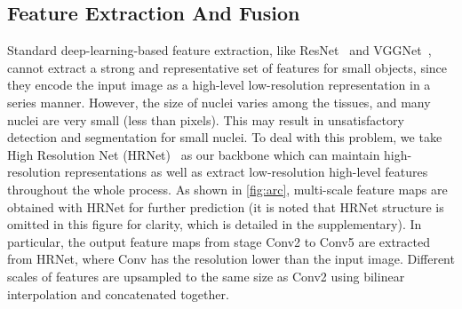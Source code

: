 \documentclass[lettersize,journal]{IEEEtran}
\begin{document}
\subsection{Feature Extraction And Fusion}
Standard deep-learning-based feature extraction, like ResNet~\cite{he2016identity} and VGGNet~\cite{simonyan2018very}, cannot extract a strong and representative set of features for small objects, since they encode the input image as a high-level low-resolution representation in a series manner. However, the size of nuclei varies among the tissues, and many nuclei are very small (less than  pixels). This may result in unsatisfactory detection and segmentation  for small nuclei. To deal with this problem, we take High Resolution Net (HRNet)~\cite{hrnet} as our backbone which can maintain high-resolution representations as well as extract low-resolution high-level features throughout the whole process. As shown in \autoref{fig:arc}, multi-scale feature maps are obtained with HRNet for further prediction (it is noted that HRNet structure is omitted in this figure for clarity, which is detailed in the supplementary). In particular, the output feature maps from stage Conv2 to Conv5 are extracted from HRNet, where Conv has the resolution  lower than the input image. Different scales of features are upsampled to the same size as Conv2 using bilinear interpolation and concatenated together.
\end{document}
